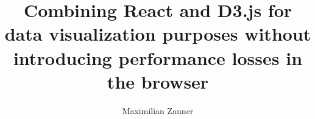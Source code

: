 \documentclass[master,english]{hgbthesis}
\title{Combining React and D3.js for data visualization purposes without introducing performance losses in the browser}
\author{Maximilian Zauner}
\begin{document}

\frontmatter							%

\maketitle
\tableofcontents


%

\mainmatter          			%









%

\MakeBibliography                        				%



\end{document}
